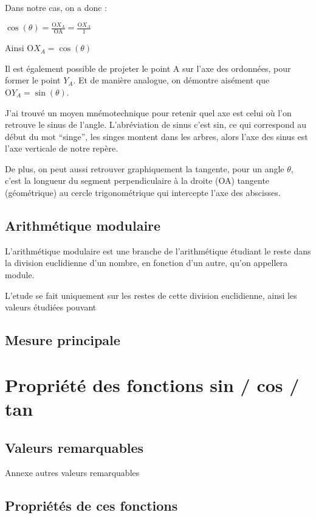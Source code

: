 \documentclass[a4paper]{article}
\begin{document}
			Dans notre cas, on a donc :

			$\cos(\theta) = \frac{\text{O}X_A}{\text{OA}} = \frac{\text{O}X_A}{1}$

			Ainsi $\text{O}X_A = \cos(\theta)$

			Il est également possible de projeter le point A sur l'axe des ordonnées, pour former le point $Y_A$. Et de manière analogue, on démontre aisément que $\text{O}Y_A = \sin(\theta)$.

			J'ai trouvé un moyen mnémotechnique pour retenir quel axe est celui où l'on retrouve le sinus de l'angle. L'abréviation de sinus c'est sin, ce qui correspond au début du mot “singe”, les singes montent dans les arbres, alors l'axe des sinus est l'axe verticale de notre repère.

			De plus, on peut aussi retrouver graphiquement la tangente, pour un angle $\theta$, c'est la longueur du segment perpendiculaire à la droite (OA) tangente (géométrique) au cercle trigonométrique qui intercepte l'axe des abscisses.

		\subsection{Arithmétique modulaire}

			L'arithmétique modulaire est une branche de l'arithmétique étudiant le reste dans la division euclidienne d'un nombre, en fonction d'un autre, qu'on appellera module. 

			L'etude se fait uniquement sur les restes de cette division euclidienne, ainsi les valeurs étudiées pouvant 

		\subsection{Mesure principale}

	\section{Propriété des fonctions sin / cos / tan}

		\subsection{Valeurs remarquables}

			Annexe autres valeurs remarquables 

		\subsection{Propriétés de ces fonctions}
\end{document}
